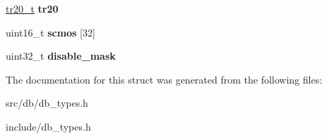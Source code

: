 \begin{DoxyCompactItemize}
\item 
\hypertarget{structmb__t_a81b47493ad7549344985e0f182d24a55}{
\hyperlink{structtr20__t}{tr20\_\-t} {\bfseries tr20}}
\label{structmb__t_a81b47493ad7549344985e0f182d24a55}

\item 
\hypertarget{structmb__t_a515f674993cfc90572e4a073f6f85eaa}{
uint16\_\-t {\bfseries scmos} \mbox{[}32\mbox{]}}
\label{structmb__t_a515f674993cfc90572e4a073f6f85eaa}

\item 
\hypertarget{structmb__t_afd201031d21020dcb23bd3f4d8ef22f0}{
uint32\_\-t {\bfseries disable\_\-mask}}
\label{structmb__t_afd201031d21020dcb23bd3f4d8ef22f0}

\end{DoxyCompactItemize}


The documentation for this struct was generated from the following files:\begin{DoxyCompactItemize}
\item 
src/db/db\_\-types.h\item 
include/db\_\-types.h\end{DoxyCompactItemize}
